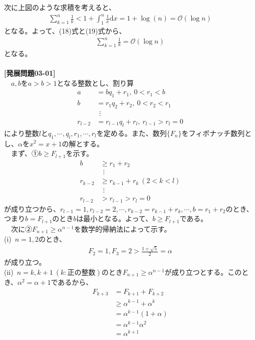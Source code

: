 \documentclass[a4paper,10.5pt]{ltjsarticle}
\begin{document}
次に上図のような求積を考えると、
\begin{align}
  \sum^{n}_{k=1}{\frac{1}{k}}<1+\int^{n}_{1}{\frac{1}{x}}\mathrm{d}x=1+\log{(n)}=\mathcal{O}(\log{n})
\end{align}
となる。よって、(18)式と(19)式から、
\begin{align}
  \sum^{n}_{k=1}{\frac{1}{k}}=\mathcal{O}(\log{n})
\end{align}
となる。\\
\\
{\large\bfseries [発展問題03-01]}\\
　$a,b$を$a>b>1$となる整数とし、割り算
\begin{align*}
  a&=bq_1+r_1,\ 0<r_1<b\\
  b&=r_1q_2+r_2,\ 0<r_2<r_1\\
  &\hspace{5pt}\vdots\\
  r_{l-2}&=r_{l-1}q_l+r_l,\ r_{l-1}>r_l=0
\end{align*}
により整数$l$と$q_1,\cdots,q_l,r_1,\cdots,r_l$を定める。また、数列$\{F_n\}$をフィボナッチ数列とし、$\alpha$を$x^2=x+1$の解とする。\\
　まず、①$b\geq F_{l+1}$を示す。
\begin{align*}
  b&\geq r_1+r_2\\
  &\hspace{5pt}\vdots\\
  r_{k-2}&\geq r_{k-1}+r_k\ (2<k<l)\\
  &\hspace{5pt}\vdots\\
  r_{l-2}&>r_{l-1}>r_l=0
\end{align*}
が成り立つから、$r_{l-1}=1,r_{l-2}=2,\cdots,r_{k-2}=r_{k-1}+r_k,\cdots,b=r_1+r_2$のとき、つまり$b=F_{l+1}$のとき$b$は最小となる。よって、$b\geq F_{l+1}$である。\\
　次に②$F_{n+1}\geq{\alpha}^{n-1}$を数学的帰納法によって示す。\\
(i)\ $n=1,2$のとき、
\begin{align*}
  F_2=1,F_3=2>\frac{1+\sqrt{5}}{2}=\alpha
\end{align*}
が成り立つ。\\
(ii)\ $n=k,k+1\ (k:正の整数)$のとき$F_{n+1}\geq{\alpha}^{n-1}$が成り立つとする。このとき、${\alpha}^2=\alpha+1$であるから、
\begin{align*}
  F_{k+3}&=F_{k+1}+F_{k+2}\\
  &\geq{\alpha}^{k-1}+{\alpha}^k\\
  &={\alpha}^{k-1}\left(1+\alpha\right)\\
  &={\alpha}^{k-1}{\alpha}^2\\
  &={\alpha}^{k+1}
\end{align*}
\end{document}
